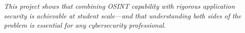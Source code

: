 \vspace{0.8cm}
\begin{center}
\parbox{0.82\textwidth}{\itshape\centering
This project shows that combining OSINT capability with rigorous application
security is achievable at student scale---and that understanding both sides
of the problem is essential for any cybersecurity professional.}
\end{center}
